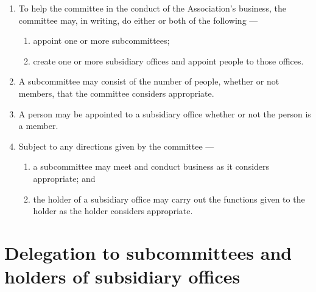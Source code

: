 \begin{enumerate}

\item To help the committee in the conduct of the Association's business, the committee may, in writing, do either or both of the following ---

  \begin{enumerate}
  
  \item appoint one or more subcommittees;
  \item create one or more subsidiary offices and appoint people to those offices.
  \end{enumerate}
\item A subcommittee may consist of the number of people, whether or not members, that the committee considers appropriate.
\item A person may be appointed to a subsidiary office whether or not the person is a member.
\item Subject to any directions given by the committee ---

  \begin{enumerate}
  
  \item a subcommittee may meet and conduct business as it considers appropriate; and
  \item the holder of a subsidiary office may carry out the functions given to the holder as the holder considers appropriate.
  \end{enumerate}
\end{enumerate}

\hypertarget{delegation-to-subcommittees-and-holders-of-subsidiary-offices}{%
\section{Delegation to subcommittees and holders of subsidiary offices}\label{delegation-to-subcommittees-and-holders-of-subsidiary-offices}}

